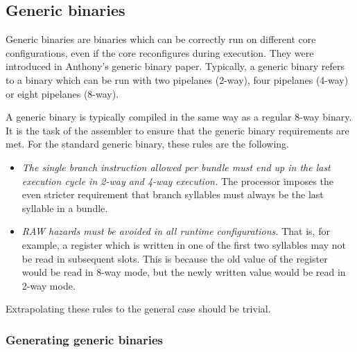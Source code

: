 
\subsection{Generic binaries}
\label{sec:core-ug-isa-gen-bin}


Generic binaries are binaries which can be correctly run on different core 
configurations, even if the core reconfigures during execution. They were 
introduced in Anthony's generic binary paper.  Typically, a generic binary refers to a binary which can 
be run with two pipelanes (2-way), four pipelanes (4-way) or eight pipelanes 
(8-way).

A generic binary is typically compiled in the same way as a regular 8-way
binary. It is the task of the assembler to ensure that the generic binary
requirements are met. For the standard generic binary, these rules are the
following.

\begin{itemize}

\item \emph{The single branch instruction allowed per bundle must end up in the 
last execution cycle in 2-way and 4-way execution.} The \rvex{} processor
imposes the even stricter requirement that branch syllables must always be the
last syllable in a bundle.

\item \emph{RAW hazards must be avoided in all runtime configurations.} That is,
for example, a register which is written in one of the first two syllables may
not be read in subsequent slots. This is because the old value of the register
would be read in 8-way mode, but the newly written value would be read in 2-way
mode.

\end{itemize}

\noindent Extrapolating these rules to the general case should be trivial.

\subsubsection{Generating generic binaries}
\label{sec:core-ug-isa-gen-gen}


